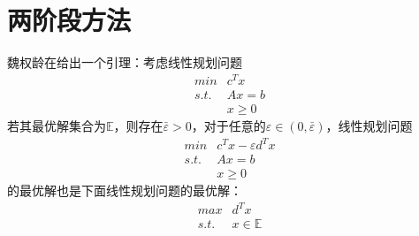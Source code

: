 \section{两阶段方法}%
魏权龄在\cite{wei2004dea}给出一个引理：考虑线性规划问题
\begin{equation}
\begin{array}{ll}
  \textit{min} & c^Tx \\
  \textit{s.t.} & Ax = b \\
  & x \ge 0
\end{array}
\end{equation}
若其最优解集合为$\mathbb{E}$，则存在$\bar{\varepsilon} >0$，对于任意的$\varepsilon\in(0,\bar{\varepsilon})$，线性规划问题
\begin{equation}
\begin{array}{ll}
  \textit{min} & c^Tx - \varepsilon d^Tx \\
  \textit{s.t.} & Ax = b \\
  & x \ge 0
\end{array}
\end{equation}
的最优解也是下面线性规划问题的最优解：
\begin{equation}
\begin{array}{ll}
  \textit{max} & d^Tx \\
  \textit{s.t.} & x \in \mathbb{E}
\end{array}
\end{equation}

